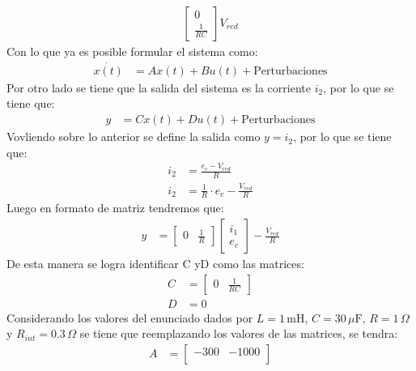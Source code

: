 \documentclass[
  11pt,
  letterpaper,
   addpoints,
   answers
  ]{exam}
\begin{document}
\begin{questions}
\begin{solution}
\begin{align}
\begin{bmatrix}
                0\\
                \frac{1}{RC}
            \end{bmatrix}
            V_{red}
        \end{align}
        Con lo que ya es posible formular el sistema como:
        \begin{align}
            \dot{x(t)} &= Ax(t) + Bu(t) + \text{Perturbaciones} 
        \end{align}
        Por otro lado se tiene que la salida del sistema es la corriente \( i_2 \), por lo que se tiene que:
        \begin{align}
            y &= Cx(t) + Du(t) + \text{Perturbaciones}
        \end{align}
        Vovliendo sobre lo anterior se define la salida como \( y = i_{2} \), por lo que se tiene que:
        \begin{align}
            i_{2} &= \frac{e_{c} - V_{red}}{R}\\
            i_{2} &= \frac{1}{R} \cdot e_{c} - \frac{V_{red}}{R}
        \end{align}
        Luego en formato de matriz tendremos que:
        \begin{align}
            y &=
            \begin{bmatrix}
                0 & \frac{1}{R}
            \end{bmatrix}
            \begin{bmatrix}
                i_{1}\\
                e_{c}
            \end{bmatrix}
            -\frac{V_{red}}{R}
        \end{align}
        De esta manera se logra identificar C yD como las matrices:
        \begin{align}
            C &=
            \begin{bmatrix}
                0 & \frac{1}{RC}
            \end{bmatrix}\\
            D &= 0
        \end{align}
        Considerando los valores del enunciado dados por \( L = 1\,\text{mH} \), \( C = 30\,\mu\text{F} \), \( R = 1\,\Omega \) y \( R_{int} = 0.3\,\Omega \) se tiene que reemplazando los valores de las matrices, se tendra:
        \begin{align}
            A &=
            \begin{bmatrix}
                -300 & -1000\\

\end{bmatrix}
\end{align}
\end{solution}
\end{questions}
\end{document}
